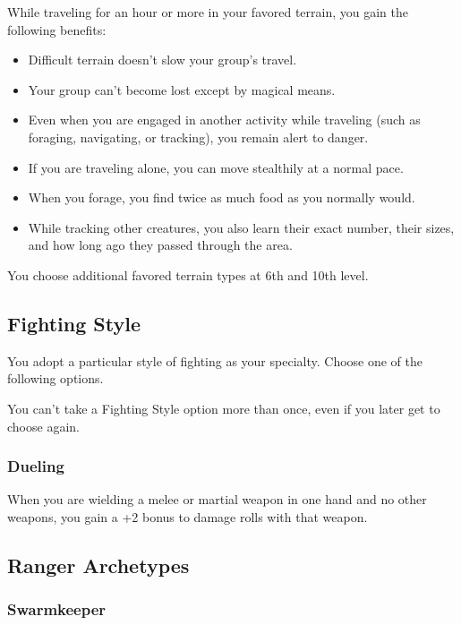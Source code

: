 \documentclass[letterpaper,openany,oneside,twocolumn]{book}
\begin{document}
While traveling for an hour or more in your favored terrain, you gain the following benefits:
\begin{itemize}
	\item Difficult terrain doesn't slow your group's travel.
	\item Your group can't become lost except by magical means.
	\item Even when you are engaged in another activity while traveling (such as foraging, navigating, or tracking), you remain alert to danger.
	\item If you are traveling alone, you can move stealthily at a normal pace.
	\item When you forage, you find twice as much food as you normally would.
	\item While tracking other creatures, you also learn their exact number, their sizes, and how long ago they passed through the area.
\end{itemize}
You choose additional favored terrain types at 6th and 10th level.

\subsection*{Fighting Style}
You adopt a particular style of fighting as your specialty. Choose one of the following options.

You can't take a Fighting Style option more than once, even if you later get to choose again.

\subsubsection*{Dueling}
When you are wielding a melee or martial weapon in one hand and no other weapons, you gain a +2 bonus to damage rolls with that weapon.

\subsection*{Ranger Archetypes}
\subsubsection*{Swarmkeeper}
\end{document}
